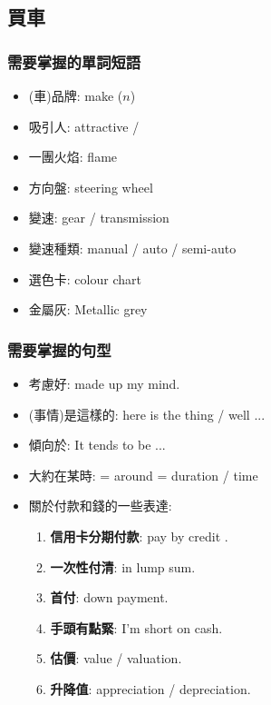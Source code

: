 \subsection{買車}
\subsubsection*{需要掌握的單詞短語}
\begin{multicols}{2}
\begin{itemize}
  \itemsep0em
  \item (車)品牌: make ($n$)
  \item 吸引人: attractive / 
  \item 一團火焰: flame
  \item 方向盤: steering wheel
  \item 變速: gear / transmission
  \item 變速種類: manual / auto / semi-auto
  \item 選色卡: colour chart
  \item 金屬灰: Metallic grey
\end{itemize}
\end{multicols}

\subsubsection*{需要掌握的句型}
\begin{multicols}{2}
\begin{itemize}
  \itemsep0em
  \item 考慮好: made up my mind.
  \item (事情)是這樣的: here is the thing / well ...
  \item 傾向於: It tends to be ... 
  \item 大約在某時:  = around = duration / time
  \item 關於付款和錢的一些表達:
  \begin{enumerate}
  \itemsep0em
    \item \textbf{信用卡分期付款}: pay by credit .
    \item \textbf{一次性付清}: in lump sum.
    \item \textbf{首付}: down payment.
    \item \textbf{手頭有點緊}: I'm short on cash.
    \item \textbf{估價}: value / valuation.
    \item \textbf{升降值}: appreciation / depreciation.
  \end{enumerate}
\end{itemize}
\end{multicols}

